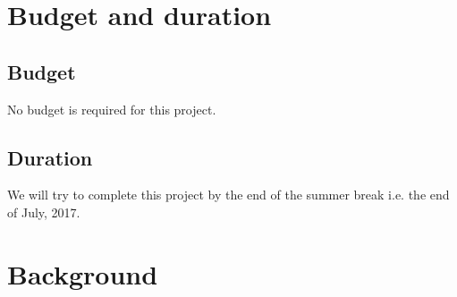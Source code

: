 \documentclass[11pt]{article}
\begin{document}
	\section{Budget and duration}	
		\subsection{Budget}
			No budget is required for this project.			
					
		\subsection{Duration}
			We will try to complete this project by the end of the summer break i.e. the end of July, 2017. 

	\section{Background} 
\end{document}
